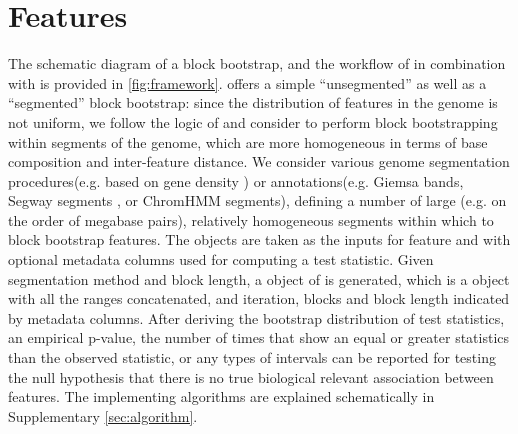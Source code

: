 \vspace*{-20pt}

\section{Features}
The schematic diagram of a block bootstrap, and the workflow of \bootranges in combination with \plyranges is provided in \cref{fig:framework}. \bootranges offers a simple ``unsegmented'' as well as a ``segmented'' block bootstrap:
since the distribution of features in the genome is not uniform, we follow the logic of \citet{bickel2010subsampling} and consider to perform block bootstrapping within segments of the genome, which are more homogeneous in terms of base composition and inter-feature distance.
We consider various genome segmentation procedures(e.g. based on gene density ) or annotations(e.g. Giemsa bands, 
Segway segments \citep{hoffman:Segway}, or ChromHMM segments\citep{ernst2012chromhmm}), defining a number of large (e.g. on the order of megabase pairs), relatively homogeneous segments within which to block bootstrap features.
The \granges objects are taken as the inputs for feature  and  with optional metadata columns used for computing a test statistic. Given segmentation method and block length, a \bootranges object of  is generated, which is a \granges object with all the ranges concatenated, and iteration, blocks and block length indicated by metadata columns. 
After deriving the bootstrap distribution of test statistics, an empirical p-value, the number of times that show an equal or greater statistics than the observed statistic, or any types of intervals can be reported for testing the null hypothesis that there is no true biological relevant association between features. 
The \bootranges implementing algorithms are explained schematically in Supplementary \cref{sec:algorithm}.


